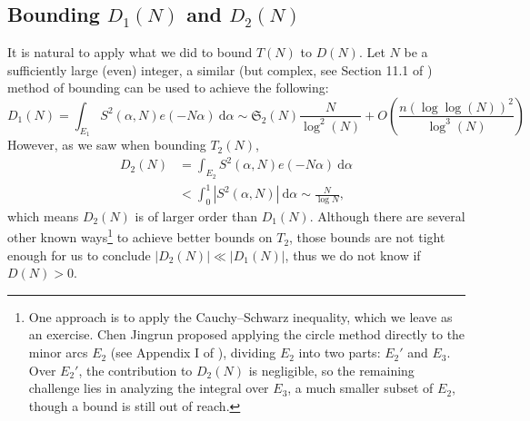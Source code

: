 \documentclass{article}
\begin{document}
\subsection{Bounding $D_1(N)$ and $D_2(N)$}
It is natural to apply what we did to bound $T(N)$ to $D(N)$. Let $N$ be a sufficiently large (even) integer, a similar (but complex, see Section 11.1 of \cite{pan}) method of bounding can be used to achieve the following:
\begin{equation}
D_1(N) = \int_{E_1} S^2(\alpha, N)e(-N\alpha) \ \mathrm{d}\alpha 
\sim \mathfrak{S}_2(N) \frac{N}{\log^2 (N)} + O\left( \frac{n (\log \log (N))^2}{\log^3 (N)} \right)
\end{equation}
However, as we saw when bounding $T_2(N)$, 
\begin{align*}
    D_2(N) &= \int_{E_2} S^2(\alpha, N)e(-N\alpha)\ \mathrm{d}\alpha\\
            &< \int_{0}^1 |S^2(\alpha, N)|\ \mathrm{d}\alpha \sim \frac{N}{\log N},
\end{align*}
which means $D_2(N)$ is of larger order than $D_1(N)$. Although there are several other known ways\footnote{One approach is to apply the Cauchy--Schwarz inequality, which we leave as an exercise. Chen Jingrun proposed applying the circle method directly to the minor arcs $E_2$ (see Appendix I of \cite{pan}), dividing $E_2$ into two parts: $E_2'$ and $E_3$. Over $E_2'$, the contribution to $D_2(N)$ is negligible, so the remaining challenge lies in analyzing the integral over $E_3$, a much smaller subset of $E_2$, though a bound is still out of reach.} to achieve better bounds on $T_2$, those bounds are not tight enough for us to conclude $|D_2(N)| \ll |D_1(N)|$, thus we do not know if $D(N) > 0$.
\end{document}

